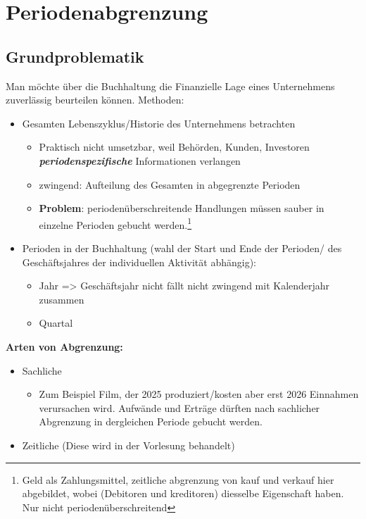
\section{Periodenabgrenzung}

\subsection{Grundproblematik}
Man möchte über die Buchhaltung die Finanzielle Lage eines Unternehmens zuverlässig beurteilen können. Methoden:
\begin{itemize}
    \item Gesamten Lebenszyklus/Historie des Unternehmens betrachten
    \begin{itemize}
        \item Praktisch nicht umsetzbar, weil Behörden, Kunden, Investoren \textit{\textbf{periodenspezifische}} Informationen verlangen
        \item zwingend: Aufteilung des Gesamten in abgegrenzte Perioden
        \item \textbf{Problem}: periodenüberschreitende Handlungen müssen sauber in einzelne Perioden gebucht werden.\footnote{Geld als Zahlungsmittel, zeitliche abgrenzung von kauf und verkauf hier abgebildet, wobei (Debitoren und kreditoren) diesselbe Eigenschaft haben. Nur nicht periodenüberschreitend}
    \end{itemize}
    \item Perioden in der Buchhaltung (wahl der Start und Ende der Perioden/ des Geschäftsjahres der individuellen Aktivität abhängig): 
    \begin{itemize}
        \item Jahr => Geschäftsjahr nicht fällt nicht zwingend mit Kalenderjahr zusammen
        \item Quartal
    \end{itemize}
\end{itemize}

\textbf{Arten von Abgrenzung:}
\begin{itemize}
    \item Sachliche
    \begin{itemize}
        \item Zum Beispiel Film, der 2025 produziert/kosten aber erst 2026 Einnahmen verursachen wird. Aufwände und Erträge dürften nach sachlicher Abgrenzung in dergleichen Periode gebucht werden. 
    \end{itemize}
    \item Zeitliche (Diese wird in der Vorlesung behandelt)
\end{itemize}

